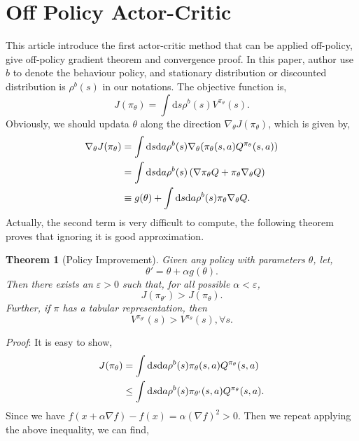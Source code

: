 \documentclass[11pt,a4paper]{article}
\def\d{{\mathrm d}}
\def\epsilon{\varepsilon}
\newtheorem{theorem}{Theorem}[subsection]
\begin{document}
\section{Off Policy Actor-Critic}
This article\cite{degris2012off} introduce the first actor-critic method that can be applied off-policy, give off-policy gradient theorem and convergence proof. In this paper, author use $b$ to denote the behaviour policy, and stationary distribution or discounted distribution is $\rho^{b}(s)$ in our notations. The objective function is,
\begin{equation}
J(\pi_{\theta}) = \int \d s \rho^b(s)V^{\pi_\theta}(s).
\end{equation}
Obviously, we should updata $\theta$ along the direction $\nabla_{\theta}J(\pi_{\theta})$, which is given by,
\begin{equation}
\aligned 
\nabla_{\theta} J(\pi_{\theta}) & = \int \d s \d a \rho^b(s) \nabla_{\theta}(\pi_{\theta}(s,a)Q^{\pi_{\theta}}(s,a)) \\ 
& = \int \d s\d a \rho^b(s)\left(\nabla \pi_{\theta}Q + \pi_{\theta}\nabla_{\theta}Q\right) \\ 
& \equiv g(\theta) + \int \d s \d a \rho^b(s)\pi_{\theta}\nabla_\theta Q.
\endaligned 
\end{equation}
Actually, the second term is very difficult to compute, the following theorem proves that ignoring it is good approximation.
\begin{theorem}[Policy Improvement]
Given any policy with parameters $\theta$, let,
\begin{equation}
\theta' = \theta + \alpha g(\theta).
\end{equation}
Then there exists an $\epsilon > 0$ such that, for all possible $\alpha < \epsilon$,
\begin{equation}
J(\pi_{\theta'}) > J(\pi_{\theta}).
\end{equation}
Further, if $\pi$ has a tabular representation, then
\begin{equation}
 V^{\pi_{\theta'}}(s) > V^{\pi_{\theta}}(s), \forall s.
 \end{equation} 
\end{theorem}
\emph{Proof}:
It is easy to show,
\begin{equation}
\aligned 
J(\pi_{\theta}) & = \int \d s\d a\rho^{b}(s)\pi_{\theta}(s,a)Q^{\pi_{\theta}}(s,a) \\
& \le \int \d s \d a \rho^{b}(s)\pi_{\theta'}(s,a)Q^{\pi_{\theta}}(s,a). 
\endaligned 
\end{equation}
Since we have $f(x+\alpha \nabla f) - f(x) = \alpha (\nabla f)^2 > 0$. Then we repeat applying the above inequality, we can find,
\end{document}
